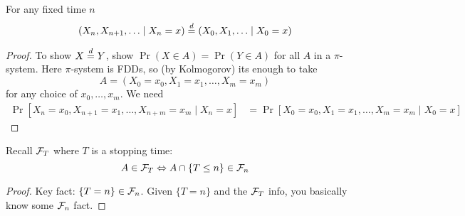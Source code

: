 
\begin{proposition}
  For any fixed time $n$
  \[
    (X_n, X_{n+1}, \ldots \mid X_n = x) \overset{d}{=} (X_0, X_1, \ldots \mid X_0 = x)
  \]
\end{proposition}

\begin{proof}
  To show $X \overset{d}{=} Y$, show $\Pr(X \in A) = \Pr(Y \in A)$
  for all $A$ in a $\pi$-system. Here $\pi$-system
  is FDDs, so (by Kolmogorov) its enough to take
  \[
    A = (X_0 = x_0, X_1 = x_1, \ldots, X_m = x_m)
  \]
  for any choice of $x_0, \ldots, x_m$.
  We need
  \begin{align*}
    \Pr[X_n = x_0, X_{n+1} = x_1, \ldots, X_{n+m} = x_m \mid X_n = x]
    &= \Pr[X_0 = x_0, X_1 = x_1, \ldots, X_m = x_m \mid X_0 = x]
  \end{align*}
\end{proof}

Recall $\mathcal{F}_T$ where $T$ is a stopping time:
\[
  A \in \mathcal{F}_T \Leftrightarrow A \cap \{T \leq n \} \in \mathcal{F}_n
\]
\begin{proof}
  Key fact: $\{T=n\} \in \mathcal{F}_n$.
  Given $\{T = n \}$ and the $\mathcal{F}_T$ info, you basically know some
  $\mathcal{F}_n$ fact.
\end{proof}
